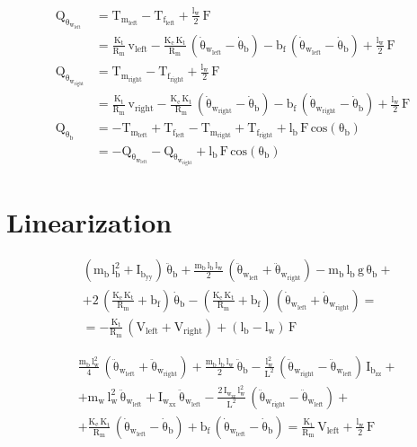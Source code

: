 \documentclass[11pt]{article}
\begin{document}
\[
  \mathrm{
    \begin{aligned}
      Q_{\theta_{w_{left}}} &= T_{m_{left}} - T_{f_{left}} + \frac{l_w}{2} \, F \\
      &= \frac{K_t}{R_m} \, v_{left} - \frac{K_e \, K_t}{R_m} \, ( \dot{\theta}_{w_{left}} - \dot{\theta}_b ) - b_f \, ( \dot{\theta}_{w_{left}} - \dot{\theta}_b ) + \frac{l_w}{2} \, F \\
      Q_{\theta_{w_{right}}} &= T_{m_{right}}-T_{f_{right}} + \frac{l_w}{2} \, F \\
      &= \frac{K_t}{R_m} \, v_{right} - \frac{K_e \, K_t}{R_m} \,( \dot{\theta}_{w_{right}} - \dot{\theta}_b ) - b_f \, ( \dot{\theta}_{w_{right}} - \dot{\theta}_b ) + \frac{l_w}{2} \, F \\
      Q_{\theta_b} &= -T_{m_{left}} + T_{f_{left}} - T_{m_{right}}+T_{f_{right}} + l_b \, F \, cos(\theta_b) \\
      &= -Q_{\theta_{w_{left}}}-Q_{\theta_{w_{right}}} + l_b \, F \, cos(\theta_b)
    \end{aligned}
  }
\]

\section{Linearization}

\[
  \mathrm{
    \begin{aligned}
      & ( m_b \, l_b^2 + I_{b_{yy}} ) \, \ddot{\theta}_b + \frac{m_b \, l_b \, l_w}{2} \, ( \ddot{\theta}_{w_{left}} + \ddot{\theta}_{w_{right}} ) - m_b \, l_b \, g \, \theta_b + \\
      & + 2 \, ( \frac{K_e \, K_t}{R_m} + b_f ) \, \dot{\theta}_b - ( \frac{K_e \, K_t}{R_m} + b_f ) \, ( \dot{\theta}_{w_{left}} + \dot{\theta}_{w_{right}} ) = \\
      & = - \frac{K_t}{R_m} \, ( V_{left} + V_{right} ) + ( l_b - l_w ) \, F
    \end{aligned}
  }
\]

\[
  \mathrm{
    \begin{aligned}
      & \frac{m_b \, l_w^2}{4} \, ( \ddot{\theta}_{w_{left}} + \ddot{\theta}_{w_{right}} ) + \frac{m_b \, l_b \, l_w}{2} \, \ddot{\theta}_b - \frac{l_w^2}{L^2} \, ( \ddot{\theta}_{w_{right}} - \ddot{\theta}_{w_{left}} ) \, I_{b_{zz}} + \\
      & + m_w \, l_w^2 \, \ddot{\theta}_{w_{left}} + I_{w_{xx}} \, \ddot{\theta}_{w_{left}} - \frac{2 \, I_{w_{zz}} \, l_w^2}{L^2} \, ( \ddot{\theta}_{w_{right}} - \ddot{\theta}_{w_{left}} ) + \\
      & + \frac{K_e \, K_t}{R_m} \, ( \dot{\theta}_{w_{left}} - \dot{\theta}_b ) + b_f \, ( \dot{\theta}_{w_{left}} - \dot{\theta}_b ) = \frac{K_t}{R_m} \, V_{left} + \frac{l_w}{2} \, F
    \end{aligned}
  }
\]
\end{document}
